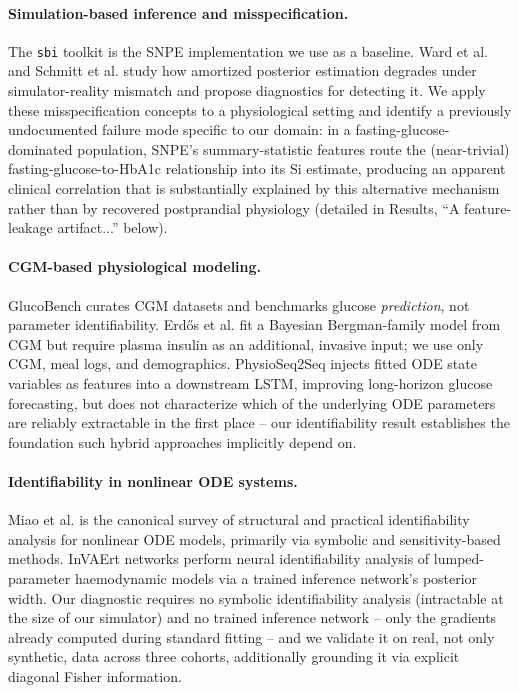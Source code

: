 \documentclass[letterpaper]{article} %
\begin{document}
\paragraph{Simulation-based inference and misspecification.} The \texttt{sbi} toolkit
\citep{tejerocantero2020sbi} is the SNPE implementation we use as a baseline. Ward et al.
\citep{ward2022robust} and Schmitt et al. \citep{schmitt2023detecting} study how amortized
posterior estimation degrades under simulator-reality mismatch and propose diagnostics for
detecting it. We apply these misspecification concepts to a physiological setting and identify a
previously undocumented failure mode specific to our domain: in a fasting-glucose-dominated
population, SNPE's summary-statistic features route the (near-trivial) fasting-glucose-to-HbA1c
relationship into its Si estimate, producing an apparent clinical correlation that is
substantially explained by this alternative mechanism rather than by recovered postprandial
physiology (detailed in Results, ``A feature-leakage artifact...'' below).

\paragraph{CGM-based physiological modeling.} GlucoBench \citep{sergazinov2024glucobench} curates
CGM datasets and benchmarks glucose \emph{prediction}, not parameter identifiability. Erd\H{o}s et
al. \citep{erdos2024leveraging} fit a Bayesian Bergman-family model from CGM but require plasma
insulin as an additional, invasive input; we use only CGM, meal logs, and demographics.
PhysioSeq2Seq \citep{tran2026physioseq2seq} injects fitted ODE state variables as features into a
downstream LSTM, improving long-horizon glucose forecasting, but does not characterize which of
the underlying ODE parameters are reliably extractable in the first place -- our identifiability
result establishes the foundation such hybrid approaches implicitly depend on.

\paragraph{Identifiability in nonlinear ODE systems.} Miao et al. \citep{miao2011identifiability}
is the canonical survey of structural and practical identifiability analysis for nonlinear ODE
models, primarily via symbolic and sensitivity-based methods. InVAErt networks
\citep{tong2025invaert} perform neural identifiability analysis of lumped-parameter haemodynamic
models via a trained inference network's posterior width. Our diagnostic requires no symbolic
identifiability analysis (intractable at the size of our simulator) and no trained inference
network -- only the gradients already computed during standard fitting -- and we validate it on
real, not only synthetic, data across three cohorts, additionally grounding it via explicit
diagonal Fisher information.
\end{document}
